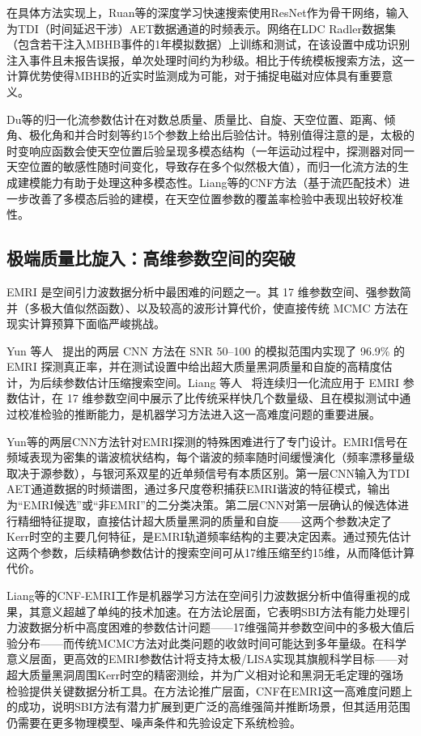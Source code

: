在具体方法实现上，Ruan等的深度学习快速搜索使用ResNet作为骨干网络，输入为TDI（时间延迟干涉）AET数据通道的时频表示。网络在LDC Radler数据集（包含若干注入MBHB事件的1年模拟数据）上训练和测试，在该设置中成功识别注入事件且未报告误报，单次处理时间约为秒级。相比于传统模板搜索方法，这一计算优势使得MBHB的近实时监测成为可能，对于捕捉电磁对应体具有重要意义。

Du等的归一化流参数估计在对数总质量、质量比、自旋、天空位置、距离、倾角、极化角和并合时刻等约15个参数上给出后验估计。特别值得注意的是，太极的时变响应函数会使天空位置后验呈现多模态结构（一年运动过程中，探测器对同一天空位置的敏感性随时间变化，导致存在多个似然极大值），而归一化流方法的生成建模能力有助于处理这种多模态性。Liang等的CNF方法（基于流匹配技术）进一步改善了多模态后验的建模，在天空位置参数的覆盖率检验中表现出较好校准性。

\subsection{极端质量比旋入：高维参数空间的突破}

EMRI 是空间引力波数据分析中最困难的问题之一。其 17 维参数空间、强参数简并（多极大值似然函数）、以及较高的波形计算代价，使直接传统 MCMC 方法在现实计算预算下面临严峻挑战。

Yun 等人~\cite{yun2024emri} 提出的两层 CNN 方法在 SNR 50--100 的模拟范围内实现了 96.9\% 的 EMRI 探测真正率，并在测试设置中给出超大质量黑洞质量和自旋的高精度估计，为后续参数估计压缩搜索空间。Liang 等人~\cite{liang2024cnfemri} 将连续归一化流应用于 EMRI 参数估计，在 17 维参数空间中展示了比传统采样快几个数量级、且在模拟测试中通过校准检验的推断能力，是机器学习方法进入这一高难度问题的重要进展。

Yun等的两层CNN方法针对EMRI探测的特殊困难进行了专门设计。EMRI信号在频域表现为密集的谐波梳状结构，每个谐波的频率随时间缓慢演化（频率漂移量级取决于源参数），与银河系双星的近单频信号有本质区别。第一层CNN输入为TDI AET通道数据的时频谱图，通过多尺度卷积捕获EMRI谐波的特征模式，输出为“EMRI候选”或“非EMRI”的二分类决策。第二层CNN对第一层确认的候选体进行精细特征提取，直接估计超大质量黑洞的质量和自旋——这两个参数决定了Kerr时空的主要几何特征，是EMRI轨道频率结构的主要决定因素。通过预先估计这两个参数，后续精确参数估计的搜索空间可从17维压缩至约15维，从而降低计算代价。

Liang等的CNF-EMRI工作是机器学习方法在空间引力波数据分析中值得重视的成果，其意义超越了单纯的技术加速。在方法论层面，它表明SBI方法有能力处理引力波数据分析中高度困难的参数估计问题——17维强简并参数空间中的多极大值后验分布——而传统MCMC方法对此类问题的收敛时间可能达到多年量级。在科学意义层面，更高效的EMRI参数估计将支持太极/LISA实现其旗舰科学目标——对超大质量黑洞周围Kerr时空的精密测绘，并为广义相对论和黑洞无毛定理的强场检验提供关键数据分析工具。在方法论推广层面，CNF在EMRI这一高难度问题上的成功，说明SBI方法有潜力扩展到更广泛的高维强简并推断场景，但其适用范围仍需要在更多物理模型、噪声条件和先验设定下系统检验。

